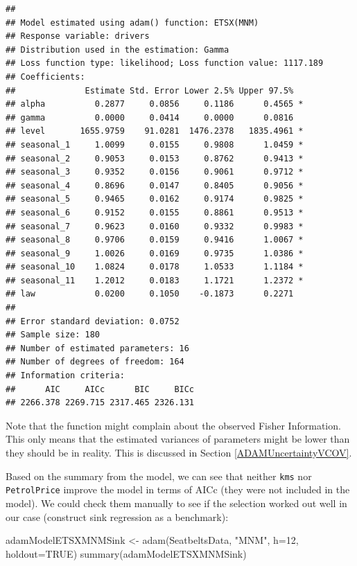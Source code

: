\documentclass[
]{book}
\newenvironment{Shaded}{\begin{snugshade}}{\end{snugshade}}
\newcommand{\AttributeTok}[1]{\textcolor[rgb]{0.77,0.63,0.00}{#1}}
\newcommand{\ConstantTok}[1]{\textcolor[rgb]{0.00,0.00,0.00}{#1}}
\newcommand{\DecValTok}[1]{\textcolor[rgb]{0.00,0.00,0.81}{#1}}
\newcommand{\FunctionTok}[1]{\textcolor[rgb]{0.00,0.00,0.00}{#1}}
\newcommand{\NormalTok}[1]{#1}
\newcommand{\OtherTok}[1]{\textcolor[rgb]{0.56,0.35,0.01}{#1}}
\newcommand{\StringTok}[1]{\textcolor[rgb]{0.31,0.60,0.02}{#1}}
\theoremstyle{definition}
\theoremstyle{definition}
\theoremstyle{definition}
\theoremstyle{definition}
\theoremstyle{remark}
\begin{document}
\begin{verbatim}
## 
## Model estimated using adam() function: ETSX(MNM)
## Response variable: drivers
## Distribution used in the estimation: Gamma
## Loss function type: likelihood; Loss function value: 1117.189
## Coefficients:
##              Estimate Std. Error Lower 2.5% Upper 97.5%  
## alpha          0.2877     0.0856     0.1186      0.4565 *
## gamma          0.0000     0.0414     0.0000      0.0816  
## level       1655.9759    91.0281  1476.2378   1835.4961 *
## seasonal_1     1.0099     0.0155     0.9808      1.0459 *
## seasonal_2     0.9053     0.0153     0.8762      0.9413 *
## seasonal_3     0.9352     0.0156     0.9061      0.9712 *
## seasonal_4     0.8696     0.0147     0.8405      0.9056 *
## seasonal_5     0.9465     0.0162     0.9174      0.9825 *
## seasonal_6     0.9152     0.0155     0.8861      0.9513 *
## seasonal_7     0.9623     0.0160     0.9332      0.9983 *
## seasonal_8     0.9706     0.0159     0.9416      1.0067 *
## seasonal_9     1.0026     0.0169     0.9735      1.0386 *
## seasonal_10    1.0824     0.0178     1.0533      1.1184 *
## seasonal_11    1.2012     0.0183     1.1721      1.2372 *
## law            0.0200     0.1050    -0.1873      0.2271  
## 
## Error standard deviation: 0.0752
## Sample size: 180
## Number of estimated parameters: 16
## Number of degrees of freedom: 164
## Information criteria:
##      AIC     AICc      BIC     BICc 
## 2266.378 2269.715 2317.465 2326.131
\end{verbatim}

Note that the function might complain about the observed Fisher Information. This only means that the estimated variances of parameters might be lower than they should be in reality. This is discussed in Section \ref{ADAMUncertaintyVCOV}.

Based on the summary from the model, we can see that neither \texttt{kms} nor \texttt{PetrolPrice} improve the model in terms of AICc (they were not included in the model). We could check them manually to see if the selection worked out well in our case (construct sink regression as a benchmark):

\begin{Shaded}
\begin{Highlighting}[]
\NormalTok{adamModelETSXMNMSink }\OtherTok{\textless{}{-}} \FunctionTok{adam}\NormalTok{(SeatbeltsData, }\StringTok{"MNM"}\NormalTok{,}
                             \AttributeTok{h=}\DecValTok{12}\NormalTok{, }\AttributeTok{holdout=}\ConstantTok{TRUE}\NormalTok{)}
\FunctionTok{summary}\NormalTok{(adamModelETSXMNMSink)}
\end{Highlighting}
\end{Shaded}
\end{document}
